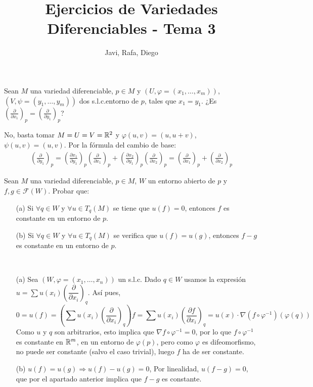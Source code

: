 \documentclass[twoside]{article}
\begin{document}
\title{Ejercicios de Variedades Diferenciables - Tema 3}
\author{Javi, Rafa, Diego}
\maketitle



\begin{ejercicio}{1}\label{1}
Sean $M$ una variedad diferenciable, $p \in M$ y $(U, \varphi = (x_1, \dots , x_m))$, $(V, \psi =
(y_1, \dots , y_m))$ dos s.l.c.entorno de $p$, tales que $x_1 = y_1$. ¿Es $\left(
\frac{\partial}{\partial x_1}\right)_p = \left(\frac{\partial}{\partial y_1}\right)_p$?
\end{ejercicio}
\begin{solucion}
No, basta tomar $M=U=V=\mathbb{R}^2$ y $φ(u,v)=(u,u+v)$, $ψ(u,v)=(u,v)$.
Por la fórmula del cambio de base:
\begin{gather*} \left(\frac{\partial}{\partial y_1}\right)_p = \left(\frac{\partial x_1}{\partial y_1}\right)_p \left(\frac{\partial}{\partial x_1}\right)_p +  \left(\frac{\partial x_2}{\partial y_1}\right)_p  \left(\frac{\partial}{\partial x_2}\right)_p =
 \left(\frac{\partial}{\partial x_1}\right)_p + \left(\frac{\partial}{\partial x_2}\right)_p
\end{gather*}
\end{solucion}
\newpage

\begin{ejercicio}{2}
Sean $M$ una variedad diferenciable, $p \in M$, $W$ un entorno abierto de $p$ y
$f,g \in \mathcal{F}(W)$. Probar que:

\begin{itemize}
\item[(a)] Si $\forall q \in W$ y $\forall u \in  T_q(M)$ se tiene que $u(f) = 0$, entonces $f$ es constante
en un entorno de $p$.
\item[(b)] Si $\forall q \in W$ y $\forall u \in T_q(M)$ se verifica que $u(f) = u(g)$, entonces $f - g$ es
constante en un entorno de $p$.
\end{itemize}
\end{ejercicio}
\begin{solucion}\
\begin{itemize}
\item[(a)] Sea $(W,\varphi=(x_1,\dots,x_n))$ un s.l.c. Dado $q\in W$ usamos la expresión $u = \sum u(x_i) \left(\dfrac{\partial}{\partial x_i}\right)_q$. Así pues, 
\[
0=u(f) = \left(\sum u(x_i) \left(\dfrac{\partial}{\partial x_i}\right)_q\right)f=\sum u(x_i) \left(\frac{\partial f}{\partial x_i}\right)_q = u(x)\cdot\nabla(f\circ\varphi^{-1})(\varphi(q))
\]
Como $u$ y $q$ son arbitrarios, esto implica que $\nabla f\circ\varphi^{-1}=0$, por lo que $f \circ \varphi^{-1}$ es constante en $\mathbb{R}^m$, en un entorno de $\varphi(p)$, pero como $\varphi$ es difeomorfismo, no puede ser constante (salvo el caso trivial), luego $f$ ha de ser constante. 
\item[(b)] $u(f) = u(g)\Rightarrow u(f)-u(g)=0$, Por linealidad, $u(f-g)=0$, que por el apartado anterior implica que $f-g$ es constante.
\end{itemize}
\end{solucion}
\end{document}
